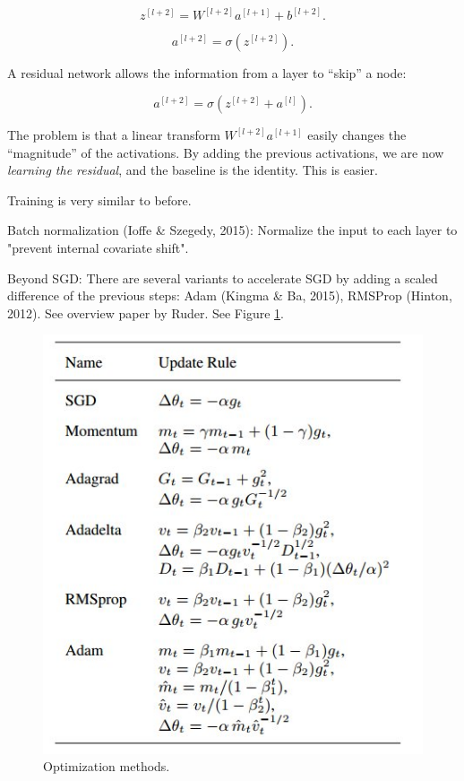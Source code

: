 \documentclass[english]{article}
\begin{document}
$$z^{[l+2]} = W^{[l+2]}a^{[l+1]}+b^{[l+2]}.$$

$$a^{[l+2]} = \sigma(z^{[l+2]}).$$

A residual network allows the information from a layer to ``skip'' a node: 

$$a^{[l+2]} = \sigma(z^{[l+2]}+ a^{[l]}).$$
 
The problem is that a linear transform $W^{[l+2]}a^{[l+1]}$ easily changes the ``magnitude'' of the activations. By adding the previous activations, we are now \emph{learning the residual}, and the baseline is the identity. This is easier. 

Training is very similar to before. 

\item Batch normalization (Ioffe \& Szegedy, 2015): Normalize the input to each layer to "prevent internal covariate shift".

\item Beyond SGD: There are several variants to accelerate SGD by adding a scaled difference of the previous steps: Adam (Kingma \& Ba, 2015), RMSProp (Hinton, 2012). See overview paper by Ruder. See Figure \ref{opt}.

\begin{figure}
  \centering
  \includegraphics[scale=0.5]{opt}
  \caption{Optimization methods.}
  \label{opt}
\end{figure}
\end{document}
